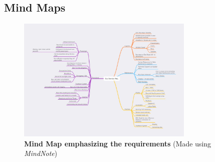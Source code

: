 \pagestyle{uselscape}
\begin{landscapes}
\section{Mind Maps}
\begin{center}
    \begin{figure}[H]
        \centering
        \includegraphics[width=0.75\textwidth,trim={1cm 2cm 0cm 2cm}, clip]{./Files/Images/MindMap.jpg}
        \caption{\textbf{Mind Map emphasizing the requirements} (Made using \textit{MindNote})}
    \end{figure}
\end{center}
\end{landscapes}
